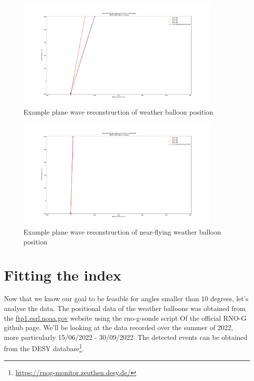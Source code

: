 \documentclass[11pt,a4paper,faculty=we,language=en,doctype=report]{cls/ugent-doc}
\begin{document}
\begin{figure}
	\centering
	\includegraphics[width=0.9\textwidth]{WeatherBalloonPositionReconstruction.pdf}
	\caption{Example plane wave reconstruction of weather balloon position}
	\label{fig:WeatherBalloonPositionReconstruction}
\end{figure}
\begin{figure}
	\centering
	\includegraphics[width=0.9\textwidth]{WeatherBalloonClosePositionReconstruction.pdf}
	\caption{Example plane wave reconstruction of near-flying weather balloon position}
	\label{fig:WeatherBalloonClosePositionReconstruction}
\end{figure}
\section{Fitting the index}
Now that we know our goal to be feasible for angles smaller than 10 degrees, let's
analyse the data. The positional data of the weather balloons was obtained from the \url{ftp1.esrl.noaa.gov} website using
the rno-g-sonde script Of the official RNO-G github page. We'll be looking at the data recorded over the summer of 2022, more
particularly 15/06/2022 - 30/09/2022. The detected events can be obtained from the DESY database\footnote{\url{https://rnog-monitor.zeuthen.desy.de/}}.
\end{document}
